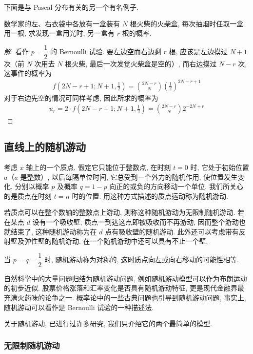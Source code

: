 \documentclass[../../main.tex]{subfiles}
\begin{document}
下面是与 Pascal 分布有关的另一个有名例子.

\begin{example}\label{example:ch02-Banach火柴盒}
数学家的左、右衣袋中各放有一盒装有 $N$ 根火柴的火柴盒, 每次抽烟时任取一盒用一根, 求发现一盒用光时, 另一盒有 $r$ 根的概率.

\begin{proof}[解]
看作 $p=\dfrac{1}{2}$ 的 Bernoulli 试验. 要左边空而右边剩 $r$ 根, 应该是左边摸过 $N+1$ 次（前 $N$ 次用去 $N$ 根火柴, 最后一次发觉火柴盒是空的）, 而右边摸过 $N-r$ 次, 这事件的概率为
\begin{align*}
f\left(2N-r+1;N+1,\frac{1}{2}\right)=\binom{2N-r}{N}\left(\frac{1}{2}\right)^{2N-r+1}
\end{align*}
对于右边先空的情况可同样考虑, 因此所求的概率为
\begin{align*}
u_r=2\cdot f\left(2N-r+1;N+1,\frac{1}{2}\right)=\binom{2N-r}{N}2^{-2N+r}
\end{align*}
\end{proof}
\end{example}

\subsection{直线上的随机游动}

考虑 $x$ 轴上的一个质点, 假定它只能位于整数点, 在时刻 $t=0$ 时, 它处于初始位置 $a$（$a$ 是整数）, 以后每隔单位时间, 它总受到一个外力的随机作用, 使位置发生变化, 分别以概率 $p$ 及概率 $q=1-p$ 向正的或负的方向移动一个单位, 我们所关心的是质点在时刻 $t=n$ 时的位置. 用这种方式描述的质点运动称为随机游动.

若质点可以在整个数轴的整数点上游动, 则称这种随机游动为无限制随机游动. 若在某点 $d$ 设有一个吸收壁, 质点一到达这点即被吸收而不再游动, 因而整个游动也就结束了, 这种随机游动称为在 $d$ 点有吸收壁的随机游动. 此外还可以考虑带有反射壁及弹性壁的随机游动. 在一个随机游动中还可以具有不止一个壁.

当 $p=q=\dfrac{1}{2}$ 时, 随机游动称为对称的, 这时质点向左或向右移动的可能性相等.

自然科学中的大量问题归结为随机游动问题, 例如随机游动模型可以作为布朗运动的初步近似. 股票价格涨落和汇率变化是否具有随机游动特征, 更是现代金融界最充满火药味的论争之一. 概率论中的一些古典问题也引导到随机游动问题, 事实上, 随机游动可以看作是 Bernoulli 试验的一种描述法.

关于随机游动, 已进行过许多研究, 我们只介绍它的两个最简单的模型.

\subsubsection{无限制随机游动}
\end{document}

